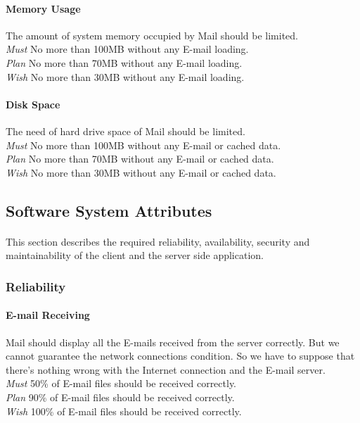 \documentclass[11pt,a4paper]{article}
\begin{document}
			\paragraph{Memory Usage} The amount of system memory occupied by Mail should be limited.\\
				\emph{Must} No more than 100MB without any E-mail loading.\\
				\emph{Plan} No more than 70MB without any E-mail loading.\\
				\emph{Wish} No more than 30MB without any E-mail loading.
			\paragraph{Disk Space} The need of hard drive space of Mail should be limited.\\
				\emph{Must} No more than 100MB without any E-mail or cached data.\\
				\emph{Plan} No more than 70MB without any E-mail or cached data.\\
				\emph{Wish} No more than 30MB without any E-mail or cached data.
        \subsection{Software System Attributes}
        	\paragraph{} This section describes the required reliability, availability, security and maintainability of the client and the server side application.
            \subsubsection{Reliability}
            	\paragraph{E-mail Receiving} Mail should display all the E-mails received from the server correctly. But we cannot guarantee the network connections condition. So we have to suppose that there's nothing wrong with the Internet connection and the E-mail server.\\
				\emph{Must} 50\% of E-mail files should be received correctly.\\
				\emph{Plan} 90\% of E-mail files should be received correctly.\\
				\emph{Wish} 100\% of E-mail files should be received correctly.
\end{document}
